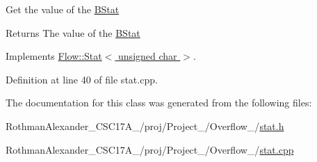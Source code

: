 Get the value of the \hyperlink{class_flow_1_1_b_stat}{B\+Stat} \begin{DoxyReturn}{Returns}
The value of the \hyperlink{class_flow_1_1_b_stat}{B\+Stat} 
\end{DoxyReturn}


Implements \hyperlink{class_flow_1_1_stat_a8861df6366e182078ea6c9bac2b718e2}{Flow\+::\+Stat$<$ unsigned char $>$}.



Definition at line 40 of file stat.\+cpp.



The documentation for this class was generated from the following files\+:\begin{DoxyCompactItemize}
\item 
Rothman\+Alexander\+\_\+\+C\+S\+C17\+A\+\_/proj/\+Project\+\_/\+Overflow\+\_/\hyperlink{stat_8h}{stat.\+h}\item 
Rothman\+Alexander\+\_\+\+C\+S\+C17\+A\+\_/proj/\+Project\+\_/\+Overflow\+\_/\hyperlink{stat_8cpp}{stat.\+cpp}\end{DoxyCompactItemize}
